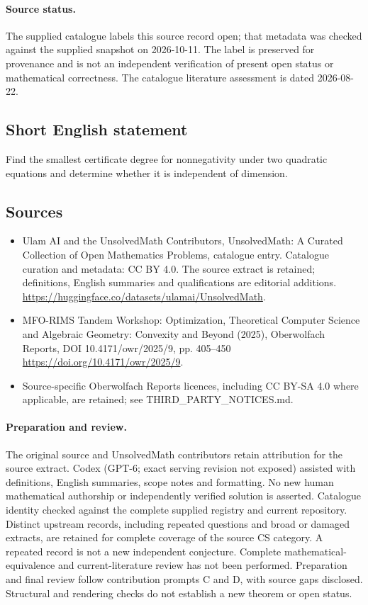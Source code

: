 \documentclass[11pt]{article}
\begin{document}
\paragraph{Source status.}
The supplied catalogue labels this source record open; that metadata was checked against the supplied snapshot on 2026-10-11. The label is preserved for provenance and is not an independent verification of present open status or mathematical correctness. The catalogue literature assessment is dated 2026-08-22.
\subsection{Short English statement}
Find the smallest certificate degree for nonnegativity under two quadratic equations and determine whether it is independent of dimension.
\subsection{Sources}
\begin{itemize}
\item[S1] Ulam AI and the UnsolvedMath Contributors, UnsolvedMath: A Curated Collection of Open Mathematics Problems, catalogue entry. Catalogue curation and metadata: CC BY 4.0. The source extract is retained; definitions, English summaries and qualifications are editorial additions.
\url{https://huggingface.co/datasets/ulamai/UnsolvedMath}.
\item[S2] MFO-RIMS Tandem Workshop: Optimization, Theoretical Computer Science and Algebraic Geometry: Convexity and Beyond (2025), Oberwolfach Reports, DOI 10.4171/owr/2025/9, pp. 405--450
\url{https://doi.org/10.4171/owr/2025/9}.
\item Source-specific Oberwolfach Reports licences, including CC BY-SA 4.0 where applicable, are retained; see THIRD\_PARTY\_NOTICES.md.
\end{itemize}
\paragraph{Preparation and review.}
The original source and UnsolvedMath contributors retain attribution for the source extract. Codex (GPT-6; exact serving revision not exposed) assisted with definitions, English summaries, scope notes and formatting. No new human mathematical authorship or independently verified solution is asserted. Catalogue identity checked against the complete supplied registry and current repository. Distinct upstream records, including repeated questions and broad or damaged extracts, are retained for complete coverage of the source CS category. A repeated record is not a new independent conjecture. Complete mathematical-equivalence and current-literature review has not been performed. Preparation and final review follow contribution prompts C and D, with source gaps disclosed. Structural and rendering checks do not establish a new theorem or open status.
\label{end:statement}
\end{document}
